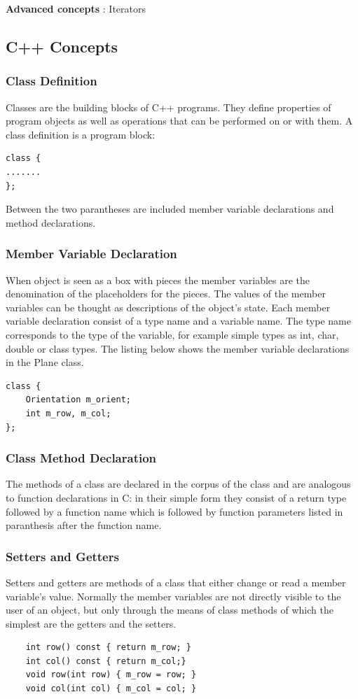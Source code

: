 \documentclass{article}
\begin{document}
\textbf {Advanced concepts} : Iterators
 


\subsection {C++ Concepts}

\subsubsection {Class Definition}
Classes are the building blocks of C++ programs. They define properties of program objects as well as operations that can be performed on or with them. A class definition is a program block:
\begin{lstlisting}
class {
.......
};
\end{lstlisting}
Between the two parantheses  are included member variable declarations and method declarations. 

\subsubsection {Member Variable Declaration}
When object is seen as a box with pieces the member variables are the denomination of the placeholders for the pieces. The values of the member variables can be thought as descriptions of the object's state. Each member variable declaration consist of a type name and a variable name. The type name corresponds to the type of the variable, for example simple types as int, char, double or class types.
The listing below shows the member variable declarations in the Plane class.
\begin{lstlisting}
class {
    Orientation m_orient;
    int m_row, m_col;
};
\end{lstlisting}

\subsubsection {Class Method Declaration}
The methods of a class are declared in the corpus of the class and are analogous to function declarations in C: in their simple form they consist of a return type followed by a function name which is followed by function parameters listed in paranthesis after the function name.

\subsubsection {Setters and Getters}
Setters and getters are methods of a class that either change or read a member variable's value. Normally the member variables are not directly visible to the user of an object, but only through the means of class methods of which the simplest are the getters and the setters.
\begin{lstlisting}
    int row() const { return m_row; }
    int col() const { return m_col;}
    void row(int row) { m_row = row; }
    void col(int col) { m_col = col; }
\end{lstlisting}
\end{document}
